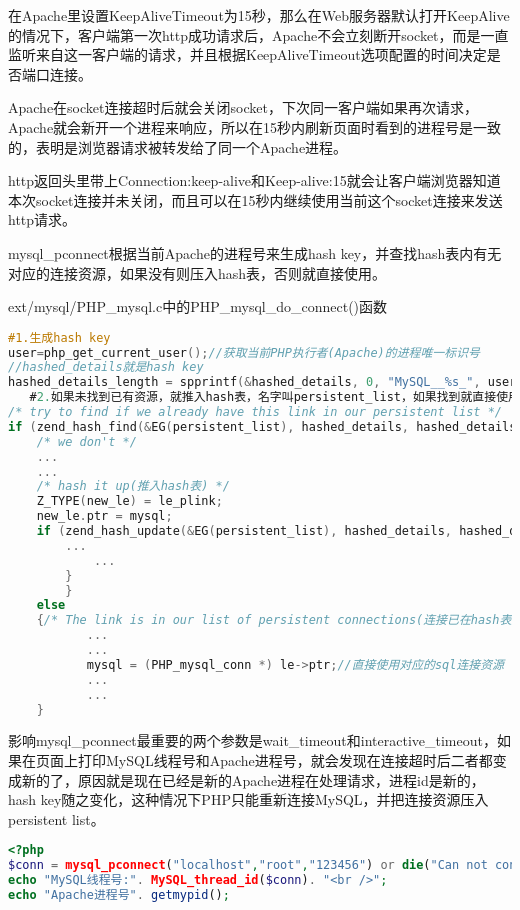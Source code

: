 在Apache里设置KeepAliveTimeout为15秒，那么在Web服务器默认打开KeepAlive的情况下，客户端第一次http成功请求后，Apache不会立刻断开socket，而是一直监听来自这一客户端的请求，并且根据KeepAliveTimeout选项配置的时间决定是否端口连接。

Apache在socket连接超时后就会关闭socket，下次同一客户端如果再次请求，Apache就会新开一个进程来响应，所以在15秒内刷新页面时看到的进程号是一致的，表明是浏览器请求被转发给了同一个Apache进程。

http返回头里带上Connection:keep-alive和Keep-alive:15就会让客户端浏览器知道本次socket连接并未关闭，而且可以在15秒内继续使用当前这个socket连接来发送http请求。

mysql\_pconnect根据当前Apache的进程号来生成hash key，并查找hash表内有无对应的连接资源，如果没有则压入hash表，否则就直接使用。



\begin{example}
ext/mysql/PHP\_mysql.c中的PHP\_mysql\_do\_connect()函数
\begin{lstlisting}[language=C]
#1.生成hash key
user=php_get_current_user();//获取当前PHP执行者(Apache)的进程唯一标识号
//hashed_details就是hash key
hashed_details_length = spprintf(&hashed_details, 0, "MySQL__%s_", user);
   #2.如果未找到已有资源，就推入hash表，名字叫persistent_list，如果找到就直接使用
/* try to find if we already have this link in our persistent list */
if (zend_hash_find(&EG(persistent_list), hashed_details, hashed_details_length+1, (void **) &le)==FAILURE) {  
	/* we don't */
	...
	...
	/* hash it up(推入hash表) */
	Z_TYPE(new_le) = le_plink;
	new_le.ptr = mysql;
	if (zend_hash_update(&EG(persistent_list), hashed_details, hashed_details_length+1, (void *) &new_le, sizeof(zend_rsrc_list_entry), NULL)==FAILURE) {
		...
    		...      
		}
  		}
	else
	{/* The link is in our list of persistent connections(连接已在hash表里)*/
           ...
           ...
           mysql = (PHP_mysql_conn *) le->ptr;//直接使用对应的sql连接资源
           ...
           ...
	}
\end{lstlisting}
\end{example}

影响mysql\_pconnect最重要的两个参数是wait\_timeout和interactive\_timeout，如果在页面上打印MySQL线程号和Apache进程号，就会发现在连接超时后二者都变成新的了，原因就是现在已经是新的Apache进程在处理请求，进程id是新的，hash key随之变化，这种情况下PHP只能重新连接MySQL，并把连接资源压入persistent list。


\begin{lstlisting}[language=PHP]
<?php
$conn = mysql_pconnect("localhost","root","123456") or die("Can not connect to MySQL");
echo "MySQL线程号:". MySQL_thread_id($conn). "<br />";
echo "Apache进程号". getmypid();
\end{lstlisting}

